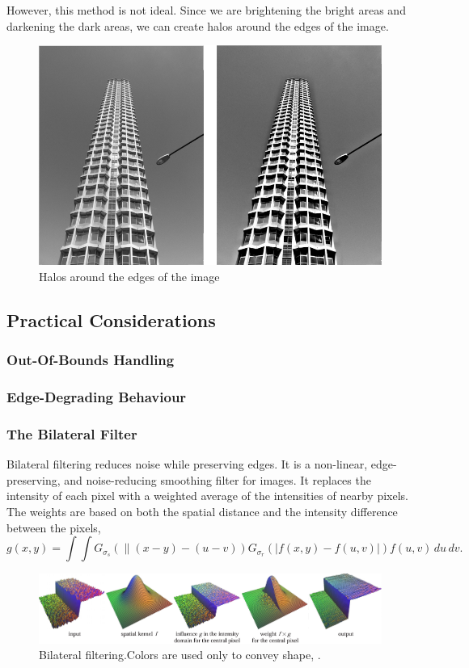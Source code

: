 However, this method is not ideal. Since we are brightening the bright areas and darkening the dark areas, we can create halos around the edges of the image. 

\begin{figure}[ht!]
    \centering
    \includegraphics[width=0.67\linewidth]{figures/sharpening-artifact.png}
    \caption{Halos around the edges of the image}
\end{figure}

\subsection{Practical Considerations}
\subsubsection{Out-Of-Bounds Handling}

\subsubsection{Edge-Degrading Behaviour}

\subsubsection{The Bilateral Filter}

Bilateral filtering reduces noise while preserving edges. It is a non-linear, edge-preserving, and noise-reducing smoothing filter for images. It replaces the intensity of each pixel with a weighted average of the intensities of nearby pixels. The weights are based on both the spatial distance and the intensity difference between the pixels, \[
    g(x, y) = \int \int G_{\sigma_s} \left( \| (x - y) - (u - v) \right) G_{\sigma_r} \left( \left| f(x, y) - f(u, v) \right| \right) f(u, v) \, du \, dv.
\]

\begin{figure}[ht!]
    \centering
    \includegraphics[width=\linewidth]{figures/bilateral-filter.png}

    \caption{Bilateral filtering.Colors are used only to convey shape, \cite{durand2002fast}.}
\end{figure}

